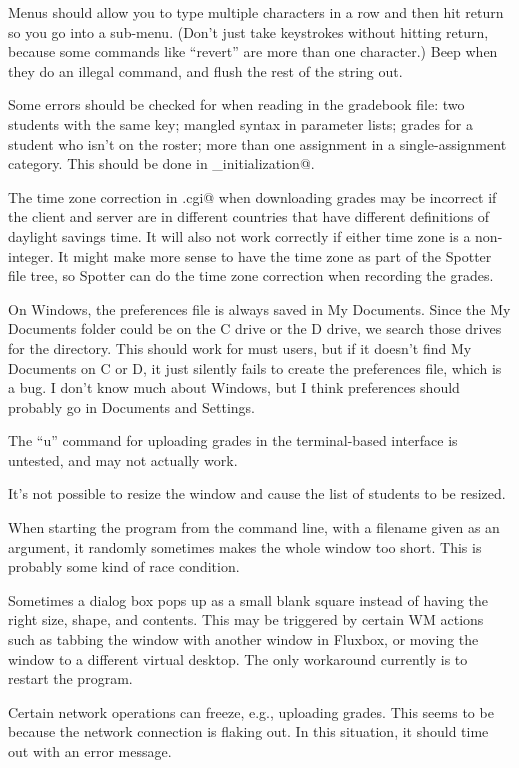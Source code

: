 \documentclass{opengrade_doc}
\begin{document}
Menus should allow you to type multiple characters in a row and then
hit return so you go into a sub-menu. (Don't just take keystrokes without
hitting return, because some commands like ``revert'' are more than
one character.) Beep when they do an illegal command, and flush the
rest of the string out.

\label{bugs}
Some errors should be checked for when reading in the gradebook
file: two students with the same key; mangled syntax in parameter
lists; grades for a student who isn't on the roster; more than one
assignment in a single-assignment category.
This should be done in \verb@misc_initialization@.

The time zone correction in \verb@ServerOG.cgi@
when downloading grades may be incorrect if the client and
server are in different countries that have different definitions
of daylight savings time. It will also not work correctly if either
time zone is a non-integer. It might make more sense to have the time
zone as part of the Spotter file tree, so Spotter can do the time
zone correction when recording the grades.

On Windows, the preferences file is always saved in My Documents. Since
the My Documents folder could be on the C drive or the D drive, we search
those drives for the directory. This should work for must users, but if
it doesn't find My Documents on C or D, it just silently fails to create
the preferences file, which is a bug. I don't know much about Windows,
but I think preferences should probably go in Documents and Settings.

The ``u'' command for uploading grades in the terminal-based interface is
untested, and may not actually work.

It's not possible to resize the window and cause the list of students to be
resized.

When starting the program from the command line, with a filename given as
an argument, it randomly sometimes makes the whole window too short. This
is probably some kind of race condition.

Sometimes a dialog box pops up as a small blank square instead of having
the right size, shape, and contents. This may be triggered by certain
WM actions such as tabbing the window with another window in Fluxbox,
or moving the window to a different virtual desktop. The only workaround
currently is to restart the program.

Certain network operations can freeze, e.g., uploading grades. This seems
to be because the network connection is flaking out. In this situation,
it should time out with an error message.
\end{document}
